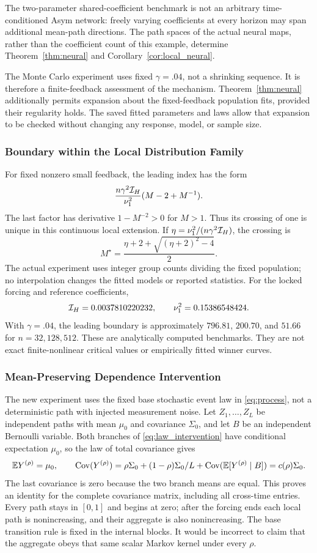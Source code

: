 The two-parameter shared-coefficient benchmark is not an arbitrary time-conditioned Asym network: freely varying coefficients at every horizon may span additional mean-path directions. The path spaces of the actual neural maps, rather than the coefficient count of this example, determine Theorem~\ref{thm:neural} and Corollary~\ref{cor:local_neural}.

The Monte Carlo experiment uses fixed $\gamma=.04$, not a shrinking sequence. It is therefore a finite-feedback assessment of the mechanism. Theorem~\ref{thm:neural} additionally permits expansion about the fixed-feedback population fits, provided their regularity holds. The saved fitted parameters and laws allow that expansion to be checked without changing any response, model, or sample size.

\subsubsection{Boundary within the Local Distribution Family}
For fixed nonzero small feedback, the leading index has the form
\[
 \frac{n\gamma^2\mathcal I_H}{\nu_1^2}(M-2+M^{-1}).
\]
The last factor has derivative $1-M^{-2}>0$ for $M>1$. Thus its crossing of one is unique in this continuous local extension. If
$\eta=\nu_1^2/(n\gamma^2\mathcal I_H)$, the crossing is
\[
 M^\star=\frac{\eta+2+\sqrt{(\eta+2)^2-4}}{2}.
\]
The actual experiment uses integer group counts dividing the fixed population; no interpolation changes the fitted models or reported statistics. For the locked forcing and reference coefficients,
\[
 \mathcal I_H=0.0037810220232,\qquad
 \nu_1^2=0.15386548424.
\]
With $\gamma=.04$, the leading boundary is approximately $796.81$, $200.70$, and $51.66$ for $n=32,128,512$. These are analytically computed benchmarks. They are not exact finite-nonlinear critical values or empirically fitted winner curves.

\subsubsection{Mean-Preserving Dependence Intervention}
\label{app:mean_preserving}
The new experiment uses the fixed base stochastic event law in \eqref{eq:process}, not a deterministic path with injected measurement noise. Let $Z_1,\ldots,Z_L$ be independent paths with mean $\mu_0$ and covariance $\Sigma_0$, and let $B$ be an independent Bernoulli variable. Both branches of \eqref{eq:law_intervention} have conditional expectation $\mu_0$, so the law of total covariance gives
\[
 \mathbb E Y^{(\rho)}=\mu_0,\qquad
 \operatorname{Cov}(Y^{(\rho)})
 =\rho\Sigma_0+(1-\rho)\Sigma_0/L
   +\operatorname{Cov}(\mathbb E[Y^{(\rho)}\mid B])
 =c(\rho)\Sigma_0.
\]
The last covariance is zero because the two branch means are equal. This proves an identity for the complete covariance matrix, including all cross-time entries. Every path stays in $[0,1]$ and begins at zero; after the forcing ends each local path is nonincreasing, and their aggregate is also nonincreasing. The base transition rule is fixed in the internal blocks. It would be incorrect to claim that the aggregate obeys that same scalar Markov kernel under every $\rho$.

